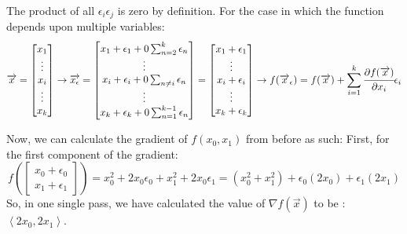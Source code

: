 \documentclass[12pt]{article}
\begin{document}
The product of all $\epsilon_{i}\epsilon_{j}$ is zero by definition.
For the case in which the function depends upon multiple variables: 
\begin{equation}
	\overrightarrow{x} = \begin{bmatrix}x_{1}\\ \vdots \\ x_{i} \\ \vdots \\ x_{k} \end{bmatrix} \rightarrow \overrightarrow{x_{\epsilon}}
	= \begin{bmatrix}x_{1}+\epsilon_{1}+0\sum_{n=2}^{k}\epsilon_{n}
	\\
	\vdots \\
	x_{i}+\epsilon_{i}+0\sum_{n\neq i}\epsilon_{n}
	\\
	\vdots \\
	x_{k}+\epsilon_{k} + 0\sum_{n=1}^{k-1}\epsilon_{n}

	\end{bmatrix} = \begin{bmatrix}
	x_{1}+\epsilon_{1} \\ \vdots \\ x_{i}+\epsilon_{i}\\ \vdots 
	\\ x_{k}+\epsilon_{k}
					\end{bmatrix}
					\rightarrow f(\overrightarrow{x}_{\epsilon}) = f(\overrightarrow{x})
					+ \sum_{i=1}^{k}\cfrac{\partial{f(\overrightarrow{x})}}{\partial{x_{i}}}\epsilon_{i}
	\label{multidimdual}
\end{equation}

Now, we can calculate the gradient of $f(x_{0},x_{1})$ from before as such:
First, for the first component of the gradient:
$$
f\left(\begin{bmatrix}x_{0} + \epsilon_{0}\\x_{1}+\epsilon_{1}\end{bmatrix}\right)
= x_{0}^{2}+2x_{0}\epsilon_{0}+x_{1}^{2}+2x_{0}\epsilon_{1}
=(x_{0}^{2}+x_{1}^{2})+\epsilon_{0}(2x_{0})+\epsilon_{1}(2x_{1})
$$
So, in one single pass, we have calculated the value of $\nabla{f(\overrightarrow{x})}$
to be : $\left<2x_{0}, 2x_{1}\right>$.
\end{document}
